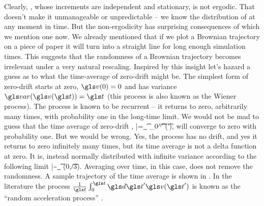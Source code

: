 Clearly, \BM, whose increments are independent and stationary, is not ergodic. That doesn't make it
unmanageable or unpredictable -- we know the distribution of \BM at any moment in time. But the non-ergodicity
has surprising consequences of which we mention one now. We already mentioned
that if we plot a Brownian trajectory on a piece of paper it will turn into a straight line for long enough
simulation times. This suggests that the randomness of a Brownian trajectory becomes irrelevant
under a very natural rescaling. Inspired by this insight let's hazard a guess as to what 
the time-average of zero-drift \BM might be. The simplest form of zero-drift \BM starts at zero, $\gv(0)=0$
and has variance $\var(\gv(\t))=\t$ (this process is also known as the Wiener process). The process is 
known to be recurrent -- it returns to zero, arbitrarily many times, with probability one in the 
long-time limit. We would not be mad to guess that the time average of zero-drift \BM,
\be
\bar{\gv}=\lim_{\t\to\infty} \int_0^\t \gd\t' \gv(\t'),
\ee
will converge to zero with probability one. But we would be wrong. Yes, the process has no drift, and
yes it returns to zero infinitely many times, but its time average is not a delta function at zero.
It is, instead normally distributed with infinite variance according to the following limit
\be
\bar{\gv}\sim \lim_{\t\to\infty} \mN(0,\t/3).
\ee
Averaging over time, in this case, does not remove the randomness. A sample 
trajectory of the time average is shown in . In the literature the process 
$\frac{1}{\t}\int_0^\t \gd\t' \gv(\t')$ is known as the ``random acceleration process'' \cite{Burkhardt2007}.

